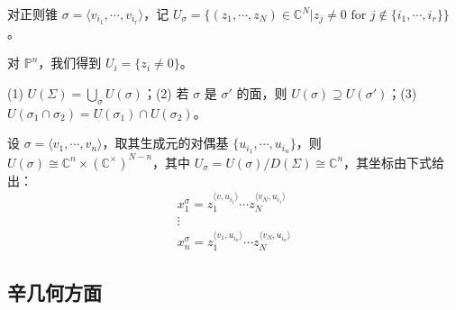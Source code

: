 \begin{definition*}
对正则锥 $\sigma=\langle v_{i_1},\dotsb,v_{i_r}\rangle$，记 $U_{\sigma}=\{(z_1,\dotsb,z_N)\in\mathbb{C}^N\vert z_j\neq 0\text{ for }j\not\in\{i_1,\dotsb, i_r\}\}$。
\end{definition*}

对 $\mathbb{P}^n$，我们得到 $U_i=\{z_i\neq 0\}$。

\begin{proposition*}
(1) $U(\Sigma)=\displaystyle\bigcup_{\sigma} U(\sigma)$；(2) 若 $\sigma$ 是 $\sigma'$ 的面，则 $U(\sigma)\supseteq U(\sigma')$；(3) $U(\sigma_1\cap\sigma_2)=U(\sigma_1)\cap U(\sigma_2)$。
\end{proposition*}


\begin{proposition*}
设 $\sigma=\langle v_1,\dotsb, v_n\rangle$，取其生成元的对偶基 $\{u_{i_1},\dotsb, u_{i_n}\}$，则 $U(\sigma)\cong\mathbb{C}^n\times\left(\mathbb{C}^{\times}\right)^{N-n}$，其中 $U_{\sigma}=U(\sigma)/D(\Sigma)\cong\mathbb{C}^n$，其坐标由下式给出：
\begin{gather*}
  x_1^{\sigma}=z_1^{\langle v,u_{i_1}\rangle}\dotsb z_N^{\langle v_N,u_{i_1}\rangle}\\
  \vdots\\
  x_n^{\sigma}=z_1^{\langle v_1,u_{i_n}\rangle}\dotsb z_N^{\langle v_N,u_{i_n}\rangle}
\end{gather*}
\end{proposition*}


\subsection{辛几何方面}


